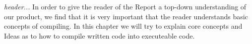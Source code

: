 \textit{header...}
In order to give the reader of the Report a top-down understanding of our product, we find that it is very important that the reader understands basic concepts of compiling. In this chapter we will try to explain core concepts and Ideas as to how to compile written code into executeable code.